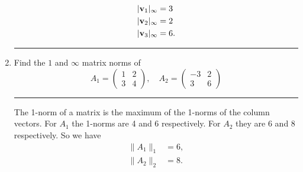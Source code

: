 \documentclass[10pt]{article}
\begin{document}
\begin{enumerate}
  \begin{align*}
    |{\bf v}_1|_{\infty} & = 3 \\
    |{\bf v}_2|_{\infty} & = 2 \\
    |{\bf v}_3|_{\infty} & = 6.
  \end{align*}
  \begin{center}
    \rule{0.9\textwidth}{.1pt}
  \end{center}  
\item Find the $1$ and $\infty$ matrix norms of
  \begin{equation*}
    A_1 =
    \begin{pmatrix}
      1 & 2 \\ 3 & 4
    \end{pmatrix}, \quad
    A_2 =
    \begin{pmatrix}
      -3 & 2 \\ 3 & 6
    \end{pmatrix}
  \end{equation*}
  \begin{center}
    \rule{0.9\textwidth}{.1pt}
  \end{center}  
  The 1-norm of a matrix is the maximum of the 1-norms of the column
  vectors. For $A_1$ the 1-norms are 4 and 6 respectively. For $A_2$
  they are 6 and 8 respectively. So we have
  \begin{align*}
    \|A_1\|_1 & = 6, \\
    \|A_2\|_2 & = 8.
  \end{align*}


\end{enumerate}
\end{document}
